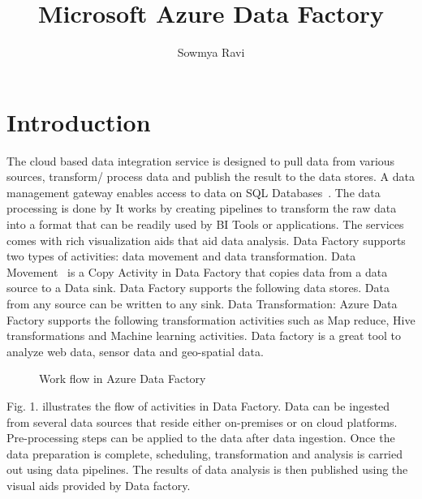 \documentclass[9pt,twocolumn,twoside]{styles/osajnl}
\title{Microsoft Azure Data Factory}
\author[1]{Sowmya Ravi}
\affil[1]{School of Informatics and Computing, Bloomington, IN 47408, U.S.A.}
\affil[*]{Corresponding authors: laszewski@gmail.com}
\begin{document}
\maketitle

\section{Introduction}
The cloud based data integration service is designed to pull data from various sources, transform/ process data and publish the result to the data stores. A data management gateway enables access to data on SQL Databases~\cite{www-jamesserra}. The data processing is done by It works by creating pipelines to  transform the raw data into a format that can be readily used by BI Tools or applications. The services comes with rich visualization aids that aid data analysis. Data Factory supports two types of activities: data movement  and data transformation. Data Movement~\cite{www-microsoft-azure} is a Copy Activity in Data Factory that copies data from a data source to a Data sink. Data Factory supports the following data stores. Data from any source can be written to any sink.  Data Transformation:  Azure Data Factory supports the following transformation activities such as Map reduce, Hive transformations and Machine learning activities.
Data factory is a great tool to analyze web data, sensor data and geo-spatial data.	
\begin{figure}[htbp]
\centering
{}
\caption{Work flow in Azure Data Factory ~\cite{www-microsoft-azure-data}}
\label{fig:copy-local}
\end{figure}

 Fig. 1.  illustrates the flow of activities in Data Factory. Data can be ingested from several data sources that reside either on-premises or on cloud platforms. Pre-processing steps can be applied to the data after data ingestion. Once the data preparation is complete, scheduling, transformation and analysis is carried out using data pipelines. The results of data analysis is then published using the visual aids provided by Data factory\cite{www-microsoft-azure-main}.
\end{document}
